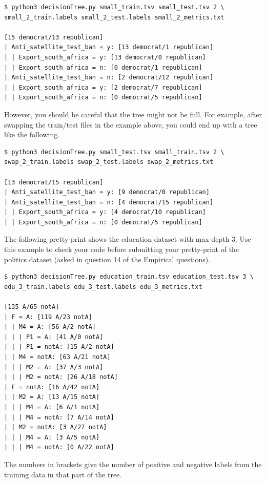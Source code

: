 \documentclass[11pt,addpoints,answers]{exam}
\begin{document}
\begin{lstlisting}[language=Shell]
$ python3 decisionTree.py small_train.tsv small_test.tsv 2 \ 
small_2_train.labels small_2_test.labels small_2_metrics.txt

[15 democrat/13 republican]
| Anti_satellite_test_ban = y: [13 democrat/1 republican]
| | Export_south_africa = y: [13 democrat/0 republican]
| | Export_south_africa = n: [0 democrat/1 republican]
| Anti_satellite_test_ban = n: [2 democrat/12 republican]
| | Export_south_africa = y: [2 democrat/7 republican]
| | Export_south_africa = n: [0 democrat/5 republican]
\end{lstlisting}

However, you should be careful that the tree might not be full. For example, after swapping the train/test files in the example above, you could end up with a tree like the following.

\begin{lstlisting}[language=Shell]
$ python3 decisionTree.py small_test.tsv small_train.tsv 2 \ 
swap_2_train.labels swap_2_test.labels swap_2_metrics.txt

[13 democrat/15 republican]
| Anti_satellite_test_ban = y: [9 democrat/0 republican]
| Anti_satellite_test_ban = n: [4 democrat/15 republican]
| | Export_south_africa = y: [4 democrat/10 republican]
| | Export_south_africa = n: [0 democrat/5 republican]
\end{lstlisting}

The following pretty-print shows the education dataset with max-depth 3.  Use this example to check your code before submitting your pretty-print of the politics dataset (asked in question 14 of the Empirical questions).  

\begin{lstlisting}[language=Shell]
$ python3 decisionTree.py education_train.tsv education_test.tsv 3 \
edu_3_train.labels edu_3_test.labels edu_3_metrics.txt

[135 A/65 notA]
| F = A: [119 A/23 notA]
| | M4 = A: [56 A/2 notA]
| | | P1 = A: [41 A/0 notA]
| | | P1 = notA: [15 A/2 notA]
| | M4 = notA: [63 A/21 notA]
| | | M2 = A: [37 A/3 notA]
| | | M2 = notA: [26 A/18 notA]
| F = notA: [16 A/42 notA]
| | M2 = A: [13 A/15 notA]
| | | M4 = A: [6 A/1 notA]
| | | M4 = notA: [7 A/14 notA]
| | M2 = notA: [3 A/27 notA]
| | | M4 = A: [3 A/5 notA]
| | | M4 = notA: [0 A/22 notA]
\end{lstlisting}

The numbers in brackets give the number of positive and negative labels from the training data in that part of the tree.
\end{document}
